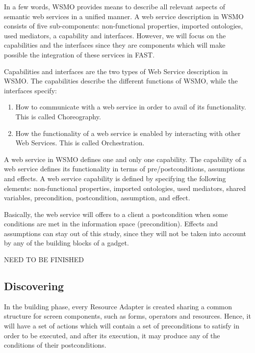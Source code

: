 \documentclass{fast_latex}
\begin{document}
In a few words, WSMO provides means to describe all relevant aspects of semantic web services in a unified manner. A web service description in WSMO consists of five sub-components: non-functional properties, imported ontologies, used mediators, a capability and interfaces. However, we will focus on the capabilities and the interfaces since they are components which will make possible the integration of these services in FAST.

Capabilities and interfaces are the two types of Web Service description in WSMO. The capabilities describe the different functions of WSMO, while the interfaces specify:
\begin{enumerate}
	\item How to communicate with a web service in order to avail of its functionality. This is called Choreography.
	\item How the functionality of a web service is enabled by interacting with other Web Services. This is called Orchestration.
\end{enumerate}

A web service in WSMO defines one and only one capability. The capability of a web service defines its functionality in terms of pre/postconditions, assumptions and effects. A web service capability is defined by specifying the following elements: non-functional properties, imported ontologies, used mediators, shared variables, precondition, postcondition, assumption, and effect.

Basically, the web service will offers to a client a postcondition when some conditions are met in the information space (precondition). Effects and assumptions can stay out of this study, since they will not be taken into account by any of the building blocks of a gadget.

NEED TO BE FINISHED


\subsection{Discovering} %
\label{sub:discovering}

In the building phase, every Resource Adapter is created sharing a common structure for screen components, such as forms, operators and resources. Hence, it will have a set of actions which will contain a set of preconditions to satisfy in order to be executed, and after its execution, it may produce any of the conditions of their postconditions.
\end{document}
